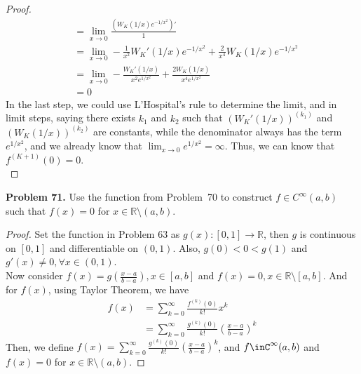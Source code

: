 \documentclass[12pt,leqno]{amsart}
\theoremstyle{definition}
\begin{document}
\begin{proof}
\begin{align*}
    & = \lim_{x\to 0}\frac{\left(W_K(1/x)e^{-1/x^2}\right)'}{1} \\
    & = \lim_{x\to 0} - \frac{1}{x^2}W_K'(1/x)e^{-1/x^2} + \frac{2}{x^4} W_K(1/x)e^{-1/x^2} \\
    & = \lim_{x\to 0} - \frac{W_K'(1/x)}{x^2 e^{1/x^2}} + \frac{2 W_K(1/x)}{x^4 e^{1/x^2}} \\
    & = 0
\end{align*}
In the last step, we could use L'Hospital's rule to determine the limit, and in limit steps, saying there exists $k_1$ and $k_2$ such that $(W_K'(1/x))^{(k_1)}$ and $(W_K(1/x))^{(k_2)}$ are constants, while the denominator always has the term $e^{1/x^2}$, and we already know that $\lim_{x\to 0}e^{1/x^2} = \infty$. Thus, we can know that $f^{(K+1)}(0) = 0$. \\
\hspace*{3em}
\end{proof}

\medskip

\noindent
{\bf Problem 71.}
Use the function from Problem~70 to construct $f\in C^\infty(a,b)$ such that $f(x)=0$ for $x\in\mathbb{R}\setminus (a,b)$.
\begin{proof}
Set the function in Problem 63 as $g(x):[0,1]\rightarrow \mathbb{R}$, then $g$ is continuous on $[0,1]$ and differentiable on $(0,1)$. Also, $g(0)<0<g(1)$ and $g'(x)\neq 0, \forall x\in(0,1)$.\\
\hspace*{3em}Now consider $f(x)=g\left(\frac{x-a}{b-a}\right), x\in [a,b]$ and $f(x)=0, x\in \mathbb{R}\setminus [a,b]$. And for $f(x)$, using Taylor Theorem, we have 
\begin{align*}
    f(x) & = \sum^\infty_{k=0}\frac{f^{(k)}(0)}{k!}x^k \\
    & = \sum^\infty_{k=0}\frac{g^{(k)}(0)}{k!}\left(\frac{x-a}{b-a}\right)^k 
\end{align*}
Then, we define $f(x)=\sum^\infty_{k=0}\frac{g^{(k)}(0)}{k!}\left(\frac{x-a}{b-a}\right)^k $, and $f\inC^\infty(a,b)$ and $f(x)=0$ for $x\in\mathbb{R}\setminus (a,b)$.
\end{proof}

\medskip
\end{document}
